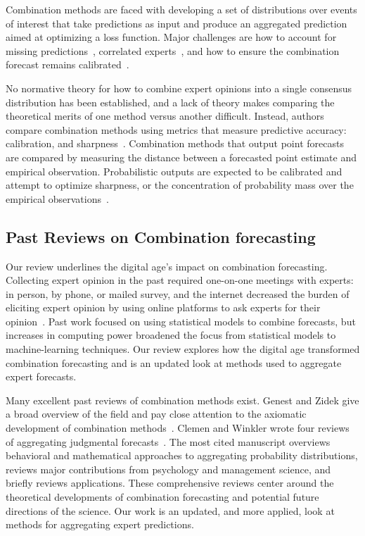 \documentclass[preprint,authoryear]{elsarticle}
\begin{document}
Combination methods are faced with developing a set of distributions over events of interest that take predictions as input and produce an aggregated prediction aimed at optimizing a loss function. 
Major challenges are how to account for missing predictions~\citep{capistran2009forecast}, correlated experts~\cite{armstrong1985long,bunn1985statistical,bunn1979synthesis}, and how to ensure the combination forecast remains calibrated~\cite{ranjan2010combining,gneiting2013combining,berrocal2007combining,glahn2009mos,kleiber2011locally,garratt2019empirically}.

No normative theory for how to combine expert opinions into a single consensus distribution has been established, and a lack of theory makes comparing the theoretical merits of one method versus another difficult. 
Instead, authors compare combination methods using metrics that measure predictive accuracy: calibration, and sharpness~\citep{jolliffe2012forecast,gneiting2007strictly,gneiting2011comparing,dawid2007geometry,hora2015calibration}.
Combination methods that output point forecasts are compared by measuring the distance between a forecasted point estimate and empirical observation.
Probabilistic outputs are expected to be calibrated and attempt to optimize sharpness, or the concentration of probability mass over the empirical observations~\citep{gneiting2007strictly,gneiting2011comparing,hora2015calibration,jolliffe2012forecast}.

\subsection{Past Reviews on Combination forecasting}

Our review underlines the digital age's impact on combination forecasting.
Collecting expert opinion in the past required one-on-one meetings with experts: in person, by phone, or mailed survey, and the internet decreased the burden of eliciting expert opinion by using online platforms to ask experts for their opinion~\citep{howe2006rise}.
Past work focused on using statistical models to combine forecasts, but increases in computing power broadened the focus from statistical models to machine-learning techniques.
Our review explores how the digital age transformed combination forecasting and is an updated look at methods used to aggregate expert forecasts. 

Many excellent past reviews of combination methods exist.
Genest and Zidek give a broad overview of the field and pay close attention to the axiomatic development of combination methods~\citep{genest1986combining}.
Clemen and Winkler wrote four reviews of aggregating judgmental forecasts~\citep{clemen1986combining, clemen1989combining, clemen1999combining,ISI:000081846900004}.
The most cited manuscript overviews behavioral and mathematical approaches to aggregating probability distributions, reviews major contributions from psychology and management science, and briefly reviews applications.
These comprehensive reviews center around the theoretical developments of combination forecasting and potential future directions of the science.
Our work is an updated, and more applied, look at methods for aggregating expert predictions.
\end{document}
